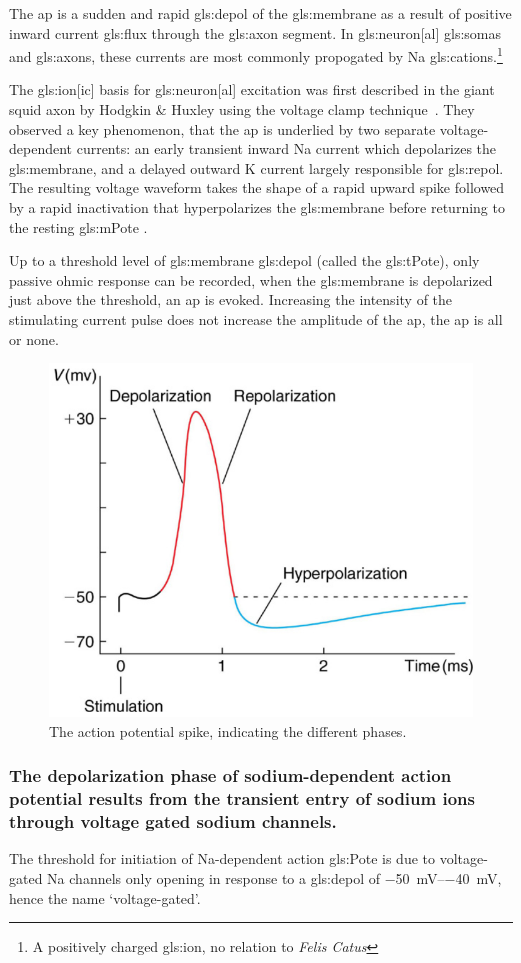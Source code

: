 \documentclass[class={myRUCProject}, crop=false]{standalone}
\begin{document}
The \gls{ap} is a sudden and rapid \gls{gls:depol} of the \gls{gls:membrane} as a result of positive inward current \gls{gls:flux} through the \gls{gls:axon} segment. In \gls{gls:neuron}[al] \glspl{gls:soma} and \glspl{gls:axon}, these currents are most commonly propogated by \gls{Na} \glspl{gls:cation}.{}\footnote{A positively charged \gls{gls:ion}, no relation to \textit{Felis Catus}}

The \gls{gls:ion}[ic] basis for \gls{gls:neuron}[al] excitation was first described in the giant squid axon by Hodgkin \& Huxley  using the voltage clamp technique~\cite{HodHux1952}. They observed a key phenomenon, that the \gls{ap} is underlied by two separate voltage-dependent currents: an early transient inward \gls{Na} current which depolarizes the \gls{gls:membrane}, and a delayed outward \gls{K} current largely responsible for \gls{gls:repol}. 
The resulting voltage waveform takes the shape of a rapid upward spike followed by a rapid inactivation that hyperpolarizes the \gls{gls:membrane} before returning to the resting \gls{gls:mPote} .

Up to a threshold level of \gls{gls:membrane} \gls{gls:depol} (called the \gls{gls:tPote}), only passive ohmic response can be recorded, when the \gls{gls:membrane} is depolarized just above the threshold, an \gls{ap} is evoked. 
Increasing the intensity of the stimulating current pulse does not increase the amplitude of the \gls{ap}, the \gls{ap} is all or none. 
\begin{figure}[H]
  \centering
  \includegraphics[width=0.5\linewidth]{Pictures//Anakin/AP.png}
  \caption{The action potential spike, indicating the different phases.}
  \label{fig:AP}
\end{figure}

\subsubsection{The depolarization phase of sodium-dependent action potential results from the transient entry of sodium ions through voltage gated sodium channels.}
The threshold for initiation of \gls{Na}-dependent action \gls{gls:Pote} is due to voltage-gated \gls{Na} channels only opening in response to a \gls{gls:depol} of \qtyrange{-50}{-40}{\mV}, hence the name `voltage-gated'. 
\end{document}
